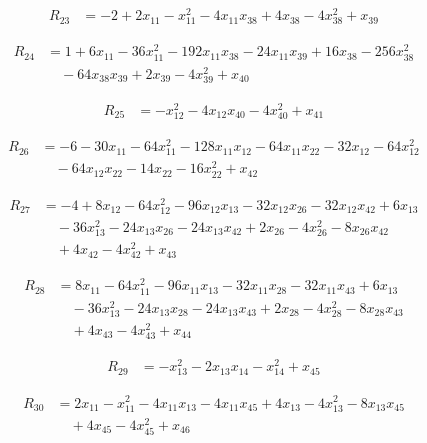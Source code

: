 \begin{align*}
R_{23} &= -2 +2 x_{11} -x_{11}^{2} -4 x_{11} x_{38} +4 x_{38} -4 x_{38}^{2} +x_{39}
\end{align*}

\begin{align*}
R_{24} &= 1 +6 x_{11} -36 x_{11}^{2} -192 x_{11} x_{38} -24 x_{11} x_{39} +16 x_{38} -256 x_{38}^{2} \\
&\quad -64 x_{38} x_{39} +2 x_{39} -4 x_{39}^{2} +x_{40}
\end{align*}

\begin{align*}
R_{25} &= -x_{12}^{2} -4 x_{12} x_{40} -4 x_{40}^{2} +x_{41}
\end{align*}

\begin{align*}
R_{26} &= -6 -30 x_{11} -64 x_{11}^{2} -128 x_{11} x_{12} -64 x_{11} x_{22} -32 x_{12} -64 x_{12}^{2} \\
&\quad -64 x_{12} x_{22} -14 x_{22} -16 x_{22}^{2} +x_{42}
\end{align*}

\begin{align*}
R_{27} &= -4 +8 x_{12} -64 x_{12}^{2} -96 x_{12} x_{13} -32 x_{12} x_{26} -32 x_{12} x_{42} +6 x_{13} \\
&\quad -36 x_{13}^{2} -24 x_{13} x_{26} -24 x_{13} x_{42} +2 x_{26} -4 x_{26}^{2} -8 x_{26} x_{42} \\
&\quad +4 x_{42} -4 x_{42}^{2} +x_{43}
\end{align*}

\begin{align*}
R_{28} &= 8 x_{11} -64 x_{11}^{2} -96 x_{11} x_{13} -32 x_{11} x_{28} -32 x_{11} x_{43} +6 x_{13} \\
&\quad -36 x_{13}^{2} -24 x_{13} x_{28} -24 x_{13} x_{43} +2 x_{28} -4 x_{28}^{2} -8 x_{28} x_{43} \\
&\quad +4 x_{43} -4 x_{43}^{2} +x_{44}
\end{align*}

\begin{align*}
R_{29} &= -x_{13}^{2} -2 x_{13} x_{14} -x_{14}^{2} +x_{45}
\end{align*}

\begin{align*}
R_{30} &= 2 x_{11} -x_{11}^{2} -4 x_{11} x_{13} -4 x_{11} x_{45} +4 x_{13} -4 x_{13}^{2} -8 x_{13} x_{45} \\
&\quad +4 x_{45} -4 x_{45}^{2} +x_{46}
\end{align*}

